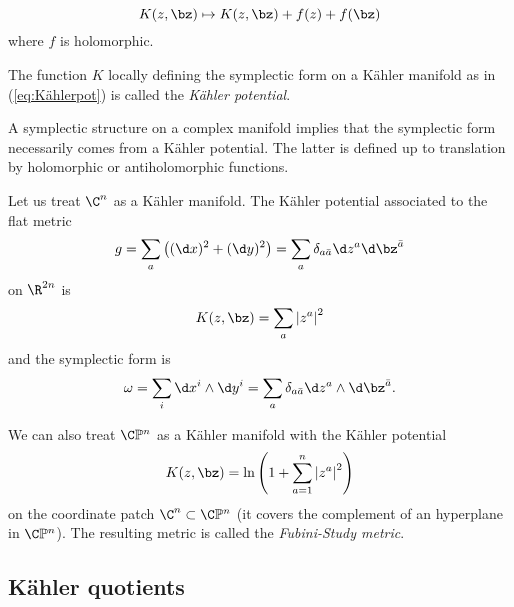 \documentclass{worksheetclass}
\begin{document}
        \begin{equation}
            K(z,\bz)\mapsto K(z,\bz)+f(z)+f(\bz)
        \end{equation}
        where $f$ is holomorphic.
        \begin{defn}
            The function $K$ locally defining the symplectic form on a Kähler manifold as in (\ref{eq:Kählerpot}) is called the \emph{Kähler potential}.
        \end{defn}
        \begin{result}
            A symplectic structure on a complex manifold implies that the symplectic form necessarily comes from a Kähler potential. The latter is defined up to translation by holomorphic or antiholomorphic functions.
        \end{result}
        
        \begin{examp}
            Let us treat $\C^n$ as a Kähler manifold. The Kähler potential associated to the flat metric
            \begin{equation}
                g = \sum_a \left( (\d x)^2+(\d y)^2 \right) = \sum_a \delta_{a\bar{a}}\d z^a\d\bz^{\bar{a}}
            \end{equation}
            on $\R^{2n}$ is
            \begin{equation}
                K(z,\bz) = \sum_a\abs{z^a}^2
            \end{equation}
            and the symplectic form is
            \begin{equation}
                \omega = \sum_i \d x^i\wedge\d y^i = \sum_a \delta_{a\bar{a}}\d z^a\wedge\d\bz^{\bar{a}}.
            \end{equation}
        \end{examp}

        \begin{examp}
            We can also treat $\C\mathbb{P}^n$ as a Kähler manifold with the Kähler potential
            \begin{equation}
                K(z,\bz) = \ln\left( 1+\sum^n_{a=1}\abs{z^a}^2 \right)
            \end{equation}
            on the coordinate patch $\C^n\subset\C\mathbb{P}^n$ (it covers the complement of an hyperplane in $\C\mathbb{P}^n$). The resulting metric is called the \emph{Fubini-Study metric}.
        \end{examp}

    \subsection{Kähler quotients}
\end{document}
